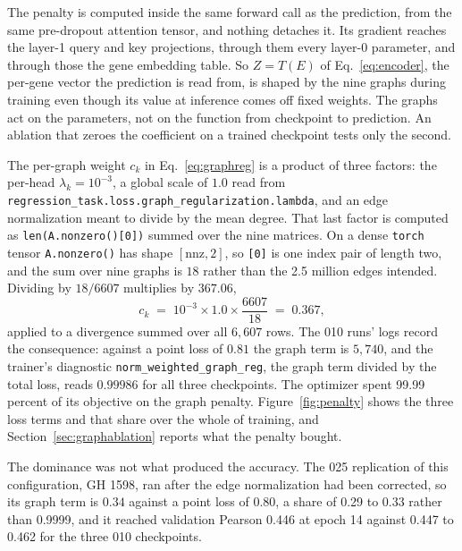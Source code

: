 The penalty is computed inside the same forward call as the prediction, from the
same pre-dropout attention tensor, and nothing detaches it. Its gradient reaches the
layer-1 query and key projections, through them every layer-0 parameter, and
through those the gene embedding table. So $Z = T(E)$ of Eq.~\ref{eq:encoder}, the
per-gene vector the prediction is read from, is shaped by the nine graphs during
training even though its value at inference comes off fixed weights. The graphs act
on the parameters, not on the function from checkpoint to prediction. An ablation
that zeroes the coefficient on a trained checkpoint tests only the second.

The per-graph weight $c_k$ in Eq.~\ref{eq:graphreg} is a product of three factors:
the per-head $\lambda_k = 10^{-3}$, a global scale of $1.0$ read from
\texttt{regression\_task.loss.graph\_regularization.lambda}, and an edge
normalization meant to divide by the mean degree. That last factor is computed as
\texttt{len(A.nonzero()[0])} summed over the nine matrices. On a dense
\texttt{torch} tensor \texttt{A.nonzero()} has shape $[\mathrm{nnz}, 2]$, so
\texttt{[0]} is one index pair of length two, and the sum over nine graphs is $18$
rather than the 2.5 million edges intended. Dividing by $18/6607$ multiplies by
$367.06$,
%
\begin{equation}
  c_k \;=\; 10^{-3} \times 1.0 \times \frac{6607}{18} \;=\; 0.367 ,
  \label{eq:effcoef}
\end{equation}
%
applied to a divergence summed over all $6{,}607$ rows. The 010 runs' logs record
the consequence: against a point loss of $0.81$ the graph term is $5{,}740$, and the
trainer's diagnostic \texttt{norm\_weighted\_graph\_reg}, the graph term divided by
the total loss, reads $0.99986$ for all three checkpoints. The optimizer spent 99.99
percent of its objective on the graph penalty. Figure~\ref{fig:penalty} shows the
three loss terms and that share over the whole of training, and
Section~\ref{sec:graphablation} reports what the penalty bought.

The dominance was not what produced the accuracy. The 025 replication of this
configuration, GH 1598, ran after the edge normalization had been corrected, so its
graph term is $0.34$ against a point loss of $0.80$, a share of 0.29 to 0.33 rather
than 0.9999, and it reached validation Pearson 0.446 at epoch 14 against 0.447 to
0.462 for the three 010 checkpoints.

